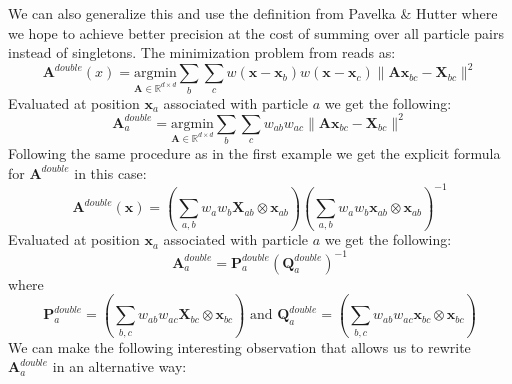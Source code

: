 \documentclass[oneside, a4paper, onecolumn, 11pt]{article}
\renewcommand{\AA}{\mathbf{A}}
\newcommand{\xx}{\mathbf{x}}
\newcommand{\XX}{\mathbf{X}}
\newcommand{\Ad}{\mathbf{A}^{double}}
\newcommand{\Qd}{\mathbf{Q}^{double}}
\newcommand{\Pd}{\mathbf{P}^{double}}
\begin{document}
\begin{section}
\begin{subsection}
    We can also generalize this and use the definition from Pavelka \& Hutter \cite{hutter-pavelka} where we hope to
    achieve better precision at the cost of summing over all particle pairs instead of singletons.
    The minimization problem from \cite{hutter-pavelka} reads as:
    \[
        \Ad(x) = \underset{\AA \in \mathbb{R}^{d\times d}}{\text{argmin}} \sum_b \sum_{c} w(\xx - \xx_b) w(\xx - \xx_c)
        \| \AA\xx_{bc} - \XX_{bc}\|^2
    \]
    Evaluated at position $\xx_a$ associated with particle $a$ we get the following: 
    \[
        \Ad_a = \underset{\AA \in \mathbb{R}^{d\times d}}{\text{argmin}} \sum_b \sum_{c} w_{ab} w_{ac}
        \| \AA\xx_{bc} - \XX_{bc}\|^2
    \]
    Following the same procedure as in the first example we get the explicit formula for 
    $\Ad$ in this case:
    \[
        \Ad(\xx) = \left( \sum_{a,b} w_a w_b \XX_{ab} \otimes \xx_{ab} \right) 
        \left( \sum_{a,b} w_a w_b \xx_{ab} \otimes \xx_{ab} \right)^{-1}
    \]
    Evaluated at position $\xx_a$ associated with particle $a$ we get the following:
    \[
        \Ad_a = \Pd_a (\Qd_a)^{-1}
    \]
    where
    \[
        \Pd_a = \left( \sum_{b,c} w_{ab} w_{ac} \XX_{bc} \otimes \xx_{bc} \right) \text{ and } 
        \Qd_a = \left( \sum_{b,c} w_{ab} w_{ac} \xx_{bc} \otimes \xx_{bc} \right)
    \]
    We can make the following interesting observation that allows us to rewrite $\Ad_{a}$ in an alternative way:


\end{subsection}
\end{section}
\end{document}
